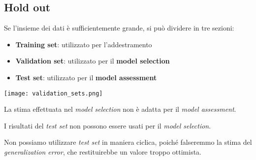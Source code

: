 \subsection{Hold out}
Se l'insieme dei dati è sufficientemente grande, si può dividere in tre sezioni:
\begin{itemize}
	\item \textbf{Training set}: utilizzato per l'addestramento
	\item \textbf{Validation set}: utilizzato per il \textbf{model selection}
	\item \textbf{Test set}: utilizzato per il \textbf{model assessment}
\end{itemize}
\begin{center}
	\texttt{[image: validation\_sets.png]}
\end{center}
\begin{note}
	La stima effettuata nel \textit{model selection} non è adatta per il \textit{model assessment}.
\end{note}
\begin{note}
	I risultati del \textit{test set} non possono essere usati per il \textit{model selection}.
\end{note}
\begin{observation}
	Non possiamo utilizzare \textit{test set} in maniera ciclica, poiché falseremmo la stima del \textit{generalization error}, che restituirebbe un valore troppo ottimista.
\end{observation}
